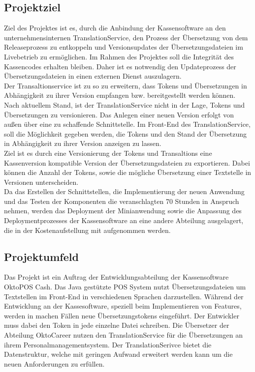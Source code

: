 \documentclass[10pt, oneside, ngerman]{article}
\begin{document}
  \subsection{Projektziel}
    Ziel des Projektes ist es, durch die Anbindung der Kassensoftware an den unternehmensinternen TranslationService,
    den Prozess der Übersetzung von dem Releaseprozess zu entkoppeln und Versionsupdates der Übersetzungsdateien im Livebetrieb zu ermöglichen.
    Im Rahmen des Projektes soll die Integrität des Kassencodes erhalten bleiben. Daher ist es notwendig den Updateprozess der Übersetzungsdateien
    in einen externen Dienst auszulagern.\\
    Der Transaltionservice ist zu so zu erweitern, dass Tokens und Übersetzungen in Abhängigkeit zu ihrer Version empfangen bzw. bereitgestellt werden können.
    Nach aktuellem Stand, ist der TranslationService nicht in der Lage, Tokens und Übersetzungen zu versionieren. 
    Das Anlegen einer neuen Version erfolgt von außen über eine zu schaffende Schnittstelle. Im Front-End des TranslationService, soll die Möglichkeit gegeben 
    werden, die Tokens und den Stand der Übersetzung in Abhängigkeit zu ihrer Version anzeigen zu lassen.\\
    Ziel ist es durch eine Versionierung der Tokens und Transaltions eine Kassenversion kompatible Version der Übersetzungsdateien zu exportieren. Dabei können die Anzahl der Tokens, sowie die 
    mögliche Übersetzung einer Textstelle in Versionen unterscheiden.\\
    Da das Erstellen der Schnittstellen, die Implementierung der neuen Anwendung und das Testen der Komponenten die veranschlagten 70 Stunden in Anspruch nehmen,
    werden das Deployment der Minianwendung sowie die Anpassung des Deploymentprozesses der Kassensoftware an eine andere Abteilung ausgelagert, die in der Kostenaufstellung mit aufgenommen werden. %
  \subsection{Projektumfeld}\label{sec:projectEnv}
    Das Projekt ist ein Auftrag der Entwicklungsabteilung der Kassensoftware OktoPOS Cash. Das Java gestützte POS System nutzt Übersetzungsdateien um Textstellen im Front-End in verschiedenen Sprachen darzustellen.
    Während der Entwicklung an der Kassesoftware, speziell beim Implementieren von Features, werden in machen Fällen neue Übersetzungstokens eingeführt. Der Entwickler muss dabei den Token in jede einzelne Datei schreiben. 
    Die Übersetzer der Abteilung OktoCareer nutzen den TranslationService für die Übersetzungen an ihrem Personalmanagementsystem. 
    Der TranslationSerivce bietet die Datenstruktur, welche mit geringen Aufwand erweitert werden kann um die neuen Anforderungen zu erfüllen. 
\end{document}
